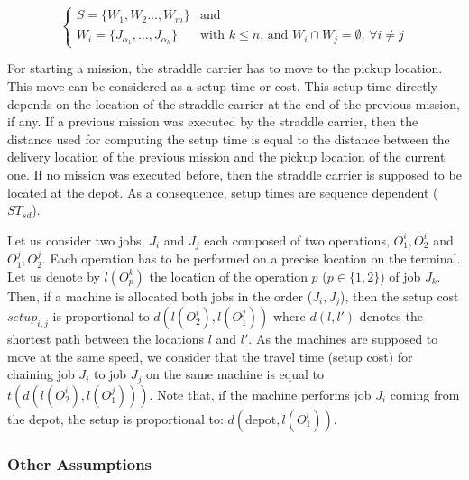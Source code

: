 \documentclass[a4paper,10pt]{article}
\begin{document}
\begin{equation*}
\begin{cases}
 S = \{ W_{1} , W_{2} \ldots , W_{m}\} & \text{and}\\
 W_{i} = \{ J_{\alpha_1} , \ldots , J_{\alpha_k} \} & \text{with $k \leq n$, and $W_{i} \cap W_{j} = \emptyset$,  $\forall i \neq j$} 
\end{cases}
\end{equation*}
 

For starting a mission, the straddle carrier has to move to the pickup location. This move can be considered as a setup time or cost. This setup time directly depends on the location of the straddle carrier at the end of the previous mission, if any. If a previous mission was executed by the straddle carrier, then the distance used for computing the setup time is equal to the distance between the delivery location of the previous mission and the pickup location of the current one. If no mission was executed before, then the straddle carrier is supposed to be located at the depot. As a consequence, setup times are sequence dependent ($ST_{sd}$). 

Let us consider two jobs, $J_i$ and $J_j$ each composed of two operations, $O^i_1, O^i_2$ and $O^j_1, O^j_2$. Each operation has to be performed on a precise location on the terminal. Let us denote by $l(O^k_p)$ the location of the operation $p$ ($p \in \{1,2\}$) of job $J_k$. Then, if a machine is allocated both jobs in the order ($J_i, J_j$), then the setup cost $setup_{i,j}$ is proportional to $d(l(O^i_2),l(O^j_1))$ where $d(l,l')$ denotes the shortest path between the locations $l$ and $l'$. As the machines are supposed to move at the same speed, we consider that the travel time (setup cost) for chaining job $J_i$ to job $J_j$ on the same machine is equal to $t(d(l(O^i_2),l(O^j_1)))$. Note that, if the machine performs job $J_i$ coming from the depot, the setup is proportional to: $d(\mbox{depot},l(O^i_1))$.

\subsubsection{Other Assumptions}
\end{document}
